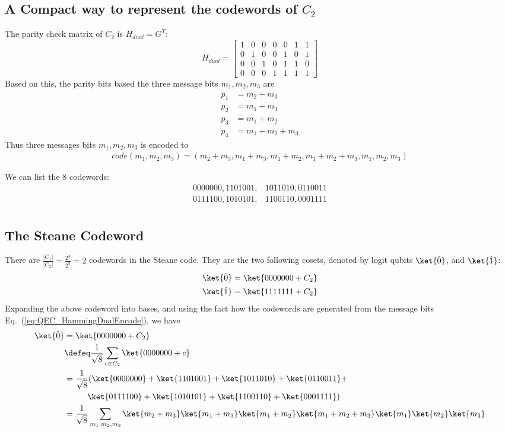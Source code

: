 \subsection{A Compact way to represent the codewords of \(C_2\)}
The parity check matrix of \(C_2\) is \(H_{dual} = G^T\):
$$H_{dual} = \begin{bmatrix}
    1 & 0 & 0 & 0 & 0 & 1 & 1 \\
    0 & 1 & 0 & 0 & 1 & 0 & 1 \\
    0 & 0 & 1 & 0 & 1 & 1 & 0 \\
    0 & 0 & 0 & 1 & 1 & 1 & 1
\end{bmatrix}$$
Based on this, the parity bits based the three message bits \(m_1, m_2, m_3\) are 
\begin{align*}
    p_1 &= m_2 + m_3 \\
    p_2 &= m_1 + m_3 \\
    p_3 &= m_1 + m_2 \\
    p_4 &= m_1 + m_2 + m_3 
\end{align*}
Thus three messages bits \(m_1, m_2, m_3\) is encoded to 
\begin{align}
code(m_1, m_2, m_3) = (m_2 + m_3, m_1 + m_3, m_1 + m_2, m_1 + m_2 + m_3, m_1, m_2, m_3)
\label{eq:QEC_HammingDualEncode}
\end{align}

We can list the 8 codewords: 
\begin{align*}
    0000000,  1101001, & 1011010, 0110011 \\
    0111100,  1010101, & 1100110, 0001111 \\
\end{align*}

\subsection{The Steane Codeword}
There are \(\frac{|C_1|}{|C_2|} = \frac{2^4}{2^3} = 2\) codewords in the Steane code. They are the two following cosets, denoted by logit qubits \(\ket{\hat{0}}\), and \(\ket{\hat{1}}\):
\begin{align*}
    \ket{\hat{0}} &= \ket{0000000 + C_2} \\
    \ket{\hat{1}} &= \ket{1111111 + C_2}  
\end{align*}
Expanding the above codeword into bases, and using the fact how the codewords are generated from the message bits Eq.~(\ref{eq:QEC_HammingDualEncode}), we have 
\begin{align}
\ket{\hat{0}} &= \ket{0000000 + C_2} \nonumber\\
&\defeq \frac{1}{\sqrt{8}}\sum_{c\in C_2}\ket{0000000 + c} \nonumber\\
&= \frac{1}{\sqrt{8}} (\ket{0000000} + \ket{1101001} + \ket{1011010} + \ket{0110011} + \nonumber \\ 
 &\;\;\;\;\;\;\;\;\;\;\ket{0111100}  + \ket{1010101}  + \ket{1100110} + \ket{0001111}) \nonumber \\
 &= \frac{1}{\sqrt{8}} \sum_{m_1,m_2,m_3}\ket{m_2 + m_3}\ket{m_1 + m_3}\ket{m_1 + m_2} \ket{m_1 + m_2 + m_3}\ket{m_1}\ket{m_2}\ket{m_3} \label{eq:QEC_SteaneSum1}
\end{align}


